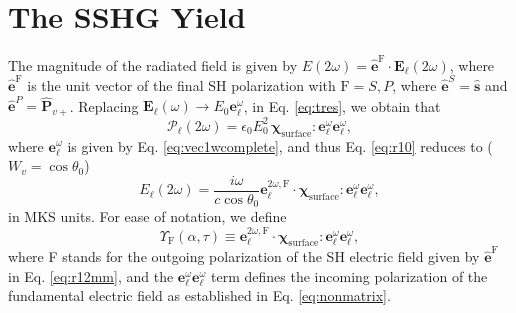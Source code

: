 \documentclass[aps,pra,10pt,amsmath,twocolumn,letterpaper]{revtex4-1}
\begin{document}
\section{The SSHG Yield}

The magnitude of the radiated field is given by $E(2\omega) =
\hat{\mathbf{e}}^{\mathrm{F}}\cdot\mathbf{E}_{\ell}(2\omega)$, where
$\hat{\mathbf{e}}^{\mathrm{F}}$ is the unit vector of the final SH polarization
with $\mathrm{F}=S,P$, where $\hat{\mathbf{e}}^S=\hat{\mathbf{s}}$ and
$\hat{\mathbf{e}}^P=\hat{\mathbf{P}}_{v+}$. Replacing
$\mathbf{E}_{\ell}(\omega)\to E_0\mathbf{e}^{\omega}_\ell$, in Eq.
\eqref{eq:tres}, we obtain that
\begin{equation*}\label{eq:m4}
\boldsymbol{\mathcal{P}}_{\ell}(2\omega) = 
\epsilon_{0}E^{2}_{0}\,
\boldsymbol{\chi}_{\mathrm{surface}}:\mathbf{e}^{\omega}_{\ell}
                                     \mathbf{e}^{\omega}_{\ell},
\end{equation*}
where $\mathbf{e}^{\omega}_{\ell}$ is given by Eq. \eqref{eq:vec1wcomplete},
and thus Eq. \eqref{eq:r10} reduces to ($W_{v}=\cos\theta_{0}$)
\begin{equation*}\label{eq:mr10}
E_{\ell}(2\omega) 
= \frac{i \omega}{c\cos\theta_{0}}
\mathbf{e}^{2\omega,\mathrm{F}}_{\ell}\cdot
\boldsymbol{\chi}_{\mathrm{surface}}:\mathbf{e}^{\omega}_{\ell}
                                     \mathbf{e}^{\omega}_{\ell},
\end{equation*}
in MKS units. For ease of notation, we define
\begin{equation}\label{eq:mc0}
\Upsilon_{\mathrm{F}}(\alpha,\tau)
\equiv 
\mathbf{e}^{2\omega,\mathrm{F}}_{\ell}\cdot
\boldsymbol{\chi}_{\mathrm{surface}}:\mathbf{e}^{\omega}_{\ell}
                                     \mathbf{e}^{\omega}_{\ell},
\end{equation}
where F stands for the outgoing polarization of the SH electric field given by
$\hat{\mathbf{e}}^{\mathrm{F}}$ in Eq. \eqref{eq:r12mm}, and the
$\mathbf{e}^{\omega}_{\ell}\mathbf{e}^{\omega}_{\ell}$ term defines the incoming
polarization of the fundamental electric field as established in Eq.
\eqref{eq:nonmatrix}.
\end{document}
